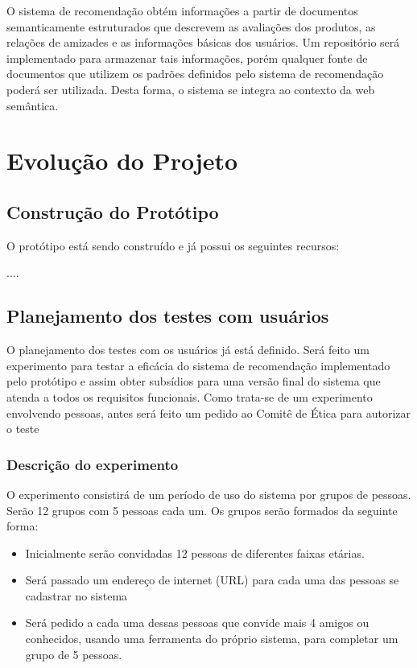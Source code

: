 

 O sistema de recomendação obtém informações a partir de documentos semanticamente estruturados que descrevem as avaliações dos produtos, as relações de amizades e as informações básicas dos usuários. Um repositório será implementado para armazenar tais informações, porém qualquer fonte de documentos que utilizem os padrões definidos pelo sistema de recomendação poderá ser utilizada. Desta forma, o sistema se integra ao contexto da web semântica.


\section{Evolução do Projeto}


\subsection{Construção do Protótipo}

O protótipo está sendo construído e já possui os seguintes recursos:

....


\subsection{Planejamento dos testes com usuários}

O planejamento dos testes com os usuários já está definido. Será feito um experimento para testar a eficácia do sistema de recomendação implementado pelo protótipo e assim obter subsídios para uma versão final do sistema que atenda a todos os requisitos funcionais. Como trata-se de um experimento envolvendo pessoas, antes será feito um pedido ao Comitê de Ética para autorizar o teste

\subsubsection{Descrição do experimento}
 O experimento consistirá de um período de uso do sistema por grupos de pessoas. Serão 12 grupos com 5 pessoas cada um. Os grupos serão formados da seguinte forma:

\begin{itemize}
	\item Inicialmente serão convidadas 12 pessoas de diferentes faixas etárias.
	\item Será passado um endereço de internet (URL) para cada uma das pessoas se cadastrar no sistema
	\item Será pedido a cada uma dessas pessoas que convide mais 4 amigos ou conhecidos, usando uma ferramenta do próprio sistema, para completar um grupo de 5 pessoas.
\end{itemize}

